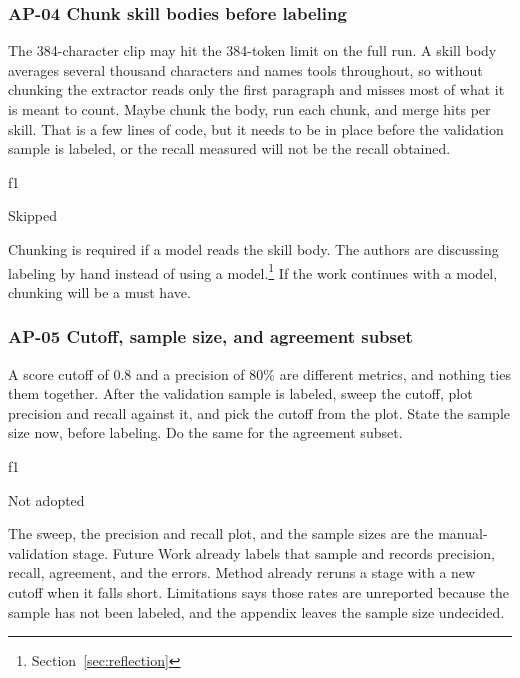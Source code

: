 \subsubsection*{AP-04 Chunk skill bodies before labeling}
\label{ap:04}

\begin{description}[leftmargin=0pt]
  \item[Point] The 384-character clip may hit the 384-token limit on the full run. A skill body averages several thousand characters and names tools throughout, so without chunking the extractor reads only the first paragraph and misses most of what it is meant to count. Maybe chunk the body, run each chunk, and merge hits per skill. That is a few lines of code, but it needs to be in place before the validation sample is labeled, or the recall measured will not be the recall obtained.
  \item[Source] f1
  \item[Decision] Skipped
  \item[Reasoning] Chunking is required if a model reads the skill body. The authors are discussing labeling by hand instead of using a model.\footnote{Section~\ref{sec:reflection}} If the work continues with a model, chunking will be a must have.
\end{description}

\subsubsection*{AP-05 Cutoff, sample size, and agreement subset}
\label{ap:05}

\begin{description}[leftmargin=0pt]
  \item[Point] A score cutoff of 0.8 and a precision of 80\% are different metrics, and nothing ties them together. After the validation sample is labeled, sweep the cutoff, plot precision and recall against it, and pick the cutoff from the plot. State the sample size now, before labeling. Do the same for the agreement subset.
  \item[Source] f1
  \item[Decision] Not adopted
  \item[Reasoning] The sweep, the precision and recall plot, and the sample sizes are the manual-validation stage. Future Work already labels that sample and records precision, recall, agreement, and the errors. Method already reruns a stage with a new cutoff when it falls short. Limitations says those rates are unreported because the sample has not been labeled, and the appendix leaves the sample size undecided.
\end{description}

